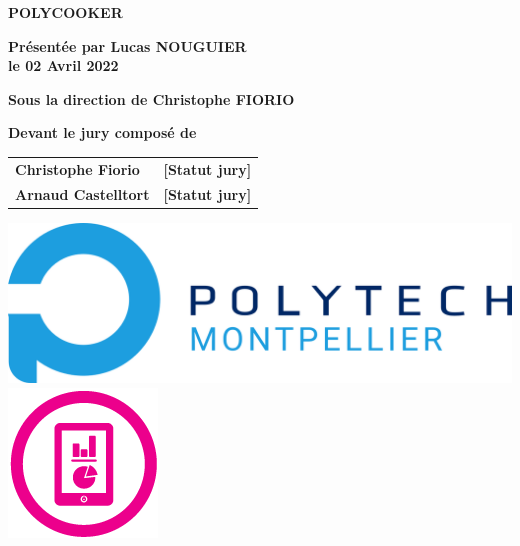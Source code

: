 \documentclass[english,12pt,a4paper]{report}
\begin{document}
\begin{titlepage}
{\bigskip

\color{Titleblue}
\fontsize{17}{20.4}\selectfont
\vspace{2cm}
\textbf{POLYCOOKER}


\vspace{4cm}
\fontsize{15}{18}\selectfont
\color{black}
\textbf{Présentée par Lucas NOUGUIER\\
le 02 Avril 2022}

\bigskip
\fontsize{13}{15.6}\selectfont
\textbf{Sous la direction de Christophe FIORIO}

\vspace{1.5cm}
\normalsize
\textbf{Devant le jury composé de}\\
\bigskip
\fontsize{10}{12}\selectfont
\vspace{1.5mm}
\begin{tabular}{p{14cm}l}
\textbf{Christophe Fiorio} & \textbf{[Statut jury]} \\
\textbf{Arnaud Castelltort} & \textbf{[Statut jury]} \\
\end{tabular} 

\vspace{\fill}
\begin{center}
	\includegraphics[scale=0.5]{LogoPolytech.png}
	\hspace{2cm}
	\includegraphics[scale=0.6]{LogoIG.png}
\end{center}
}
\end{titlepage}
\end{document}
